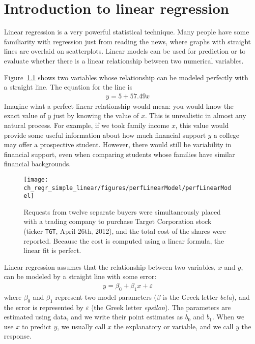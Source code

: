 \chapter{Introduction to linear regression}
\label{linRegrForTwoVar}


Linear regression is a very powerful statistical technique. Many people have some familiarity with regression just from reading the news, where graphs with straight lines are overlaid on scatterplots. Linear models can be used for prediction or to evaluate whether there is a linear relationship between two numerical variables.

Figure~\ref{perfLinearModel} shows two variables whose relationship can be modeled perfectly with a straight line. The equation for the line is
\begin{eqnarray*}
y = 5 + 57.49x
\end{eqnarray*}
Imagine what a perfect linear relationship would mean: you would know the exact value of $y$ just by knowing the value of $x$. This is unrealistic in almost any natural process. For example, if we took family income $x$, this value would provide some useful information about how much financial support $y$ a college may offer a prospective student. However, there would still be variability in financial support, even when comparing students whose families have similar financial backgrounds.

\begin{figure}
   \centering
   \texttt{[image: ch\_regr\_simple\_linear/figures/perfLinearModel/perfLinearModel]}
   \caption{Requests from twelve separate buyers were simultaneously placed with a trading company to purchase Target Corporation stock (ticker \texttt{TGT}, April 26th, 2012), and the total cost of the shares were reported. Because the cost is computed using a linear formula, the linear fit is perfect.}
   \label{perfLinearModel}
\end{figure}

Linear regression assumes that the relationship between
two variables, $x$ and $y$,
can be modeled by a straight line with some error:
\begin{eqnarray}
y = \beta_0 + \beta_1x + \varepsilon
\label{genLinModelWNoErrorTerm}
\end{eqnarray}
where $\beta_0$ and $\beta_1$ represent two model
parameters
($\beta$ is the Greek letter
  \emph{beta}),
and the error is represented by $\varepsilon$
(the Greek letter \emph{epsilon}).
The parameters are estimated using data,
and we write their point estimates as $b_0$ and $b_1$.
When we use $x$ to predict $y$,
we usually call $x$ the explanatory
or  variable,
and we call $y$ the response.

